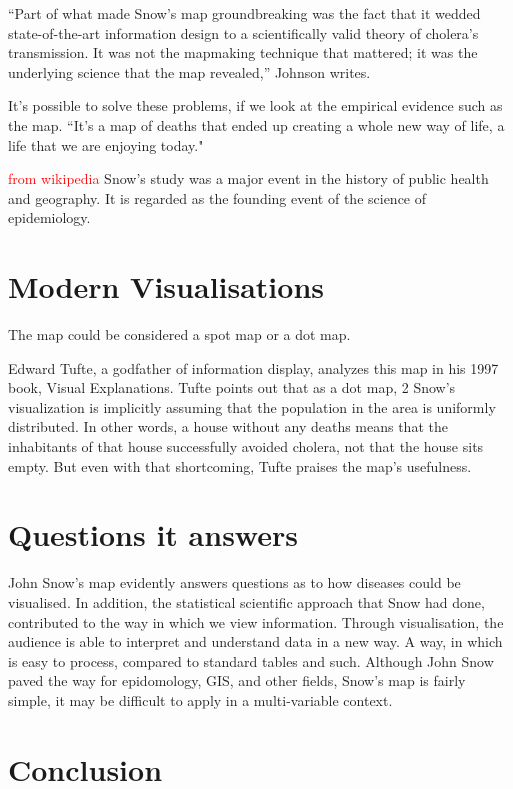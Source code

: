 \documentclass[12pt]{article}
\newcommand\todo[1]{\textcolor{red}{#1}}
\begin{document}
“Part of what made Snow’s map groundbreaking was the fact that it wedded state-of-the-art information design to a scientifically valid theory of cholera’s transmission. It was not the mapmaking technique that mattered; it was the underlying science that the map revealed,” Johnson writes. \cite{history}

It's possible to solve these problems, if we look at the empirical evidence such as the map. ``It's a  map of deaths that ended up creating a whole new way of life, a life that we are enjoying today." \cite{tedtalk}

\todo{from wikipedia}
Snow's study was a major event in the history of public health and geography. It is regarded as the founding event of the science of epidemiology.


\section{Modern Visualisations}
The map could be considered a spot map or a dot map. 

Edward Tufte, a godfather of information display, analyzes this map in his 1997 book, Visual Explanations. Tufte points out that as a dot map, 2 Snow’s visualization is implicitly assuming that the population in the area is uniformly distributed. In other words, a house without any deaths means that the inhabitants of that house successfully avoided cholera, not that the house sits empty. But even with that shortcoming, Tufte praises the map’s usefulness. \cite{blog}

\section{Questions it answers}

John Snow's map evidently answers questions as to how diseases could be visualised. In addition, the statistical scientific approach that Snow had done, contributed to the way in which we view information. Through visualisation, the audience is able to interpret and understand data in a new way. A way, in which is easy to process, compared to standard tables and such. Although John Snow paved the way for epidomology, GIS, and other fields, Snow's map is fairly simple, it may be difficult to apply in a multi-variable context. 


\section{Conclusion}


% 
% 




\end{document}
